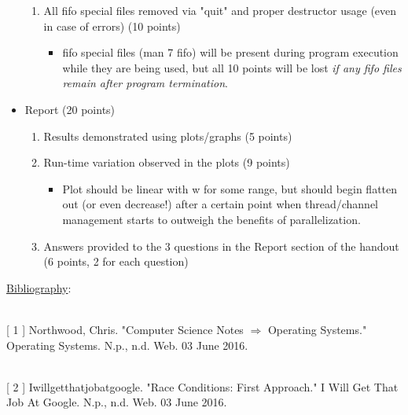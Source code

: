 \documentclass[12pt]{extarticle}
\begin{document}
\begin{itemize}
\begin{enumerate}
			\item All fifo special files removed via "quit" and proper destructor usage (even in case of errors) (10 points)
				\begin{itemize}
				\setlength\itemsep{-0.1em}
					\item fifo special files (man 7 fifo) will be present during program execution while they are being used, but all 10 points will be lost \emph{if any fifo files remain after program termination}.
				\end{itemize}
		\end{enumerate}
	\item Report (20 points)
		\begin{enumerate}
        		\setlength\itemsep{-0.1em}
			\item Results demonstrated using plots/graphs (5 points)
			\item Run-time variation observed in the plots (9 points)
				\begin{itemize}
        				\setlength\itemsep{-0.1em}
					\item Plot should be linear with w for some range, but should begin flatten out (or even decrease!) after a certain point when thread/channel management starts to outweigh the benefits of parallelization.
				\end{itemize}
			\item Answers provided to the 3 questions in the Report section of the handout (6 points, 2 for each question)
		\end{enumerate}
\end{itemize}

\newpage
\noindent
{\large \underline{Bibliography}:}

\ \\
{[} 1 {]} \hspace{1.2mm} Northwood, Chris. "Computer Science Notes $\Rightarrow$ Operating Systems." Operating
\hspace*{1.15cm} Systems. N.p., n.d. Web. 03 June 2016.

\ \\
{[} 2 {]} \hspace{1.7mm} Iwillgetthatjobatgoogle. "Race Conditions: First Approach." I Will Get That Job
\hspace*{1.05cm} At Google. N.p., n.d. Web. 03 June 2016.
\end{document}
